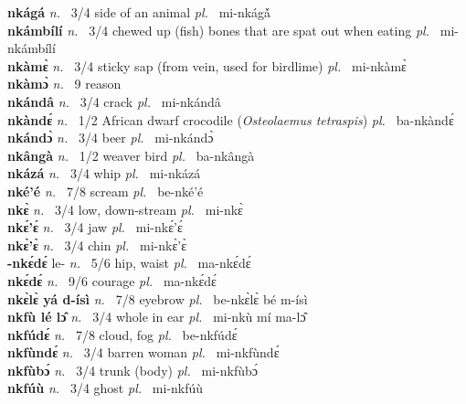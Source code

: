 {\bfseries nkágá}  {\itshape n.~} 3/4 side of an animal {\itshape pl.~} mi-nkágá̀        \\ 
{\bfseries nkámbílí}  {\itshape n.~} 3/4 chewed up (fish) bones that are spat out when eating {\itshape pl.~} mi-nkámbílí    \\ 
{\bfseries nkàmɛ̀}  {\itshape n.~} 3/4 sticky sap (from vein, used for birdlime) {\itshape pl.~} mi-nkàmɛ̀    \\ 
{\bfseries nkàmɔ̀}  {\itshape n.~} 9 reason    \\ 
{\bfseries nkándâ}  {\itshape n.~} 3/4 crack {\itshape pl.~} mi-nkándâ    \\ 
{\bfseries nkàndɛ́}  {\itshape n.~} 1/2 African dwarf crocodile ({\itshape Osteolaemus tetraspis}) {\itshape pl.~} ba-nkàndɛ́    \\ 
{\bfseries nkándɔ̀}  {\itshape n.~} 3/4 beer {\itshape pl.~} mi-nkándɔ̀    \\ 
{\bfseries nkângà}  {\itshape n.~} 1/2 weaver bird {\itshape pl.~} ba-nkângà    \\ 
{\bfseries nkázá}  {\itshape n.~} 3/4 whip {\itshape pl.~} mi-nkázá    \\ 
{\bfseries nké'é}  {\itshape n.~} 7/8 scream {\itshape pl.~} be-nké'é    \\ 
{\bfseries nkɛ̀}  {\itshape n.~} 3/4 low, down-stream {\itshape pl.~} mi-nkɛ̀    \\ 
{\bfseries nkɛ́'ɛ́}  {\itshape n.~} 3/4 jaw {\itshape pl.~} mi-nkɛ́'ɛ́    \\ 
{\bfseries nkɛ̀'ɛ̀}  {\itshape n.~} 3/4 chin {\itshape pl.~} mi-nkɛ̀'ɛ̀    \\ 
{\bfseries -nkɛ́dɛ́} le- {\itshape n.~} 5/6 hip, waist {\itshape pl.~} ma-nkɛ́dɛ́    \\ 
{\bfseries nkɛ́dɛ́}  {\itshape n.~} 9/6 courage {\itshape pl.~} ma-nkɛ́dɛ́    \\ 
{\bfseries nkɛ̀lɛ̀ yá d-ísì}  {\itshape n.~} 7/8 eyebrow {\itshape pl.~} be-nkɛ̀lɛ̀ bé m-ísì    \\ 
{\bfseries nkfù lé lɔ̂}  {\itshape n.~} 3/4 whole in ear {\itshape pl.~} mi-nkù mí ma-lɔ̂    \\ 
{\bfseries nkfúdɛ́}  {\itshape n.~} 7/8 cloud, fog {\itshape pl.~} be-nkfúdɛ́    \\ 
{\bfseries nkfùndɛ́}  {\itshape n.~} 3/4 barren woman {\itshape pl.~} mi-nkfùndɛ́    \\ 
{\bfseries nkfùbɔ́}  {\itshape n.~} 3/4 trunk (body) {\itshape pl.~} mi-nkfùbɔ́    \\ 
{\bfseries nkfúù}  {\itshape n.~} 3/4 ghost {\itshape pl.~} mi-nkfúù    \\ 

